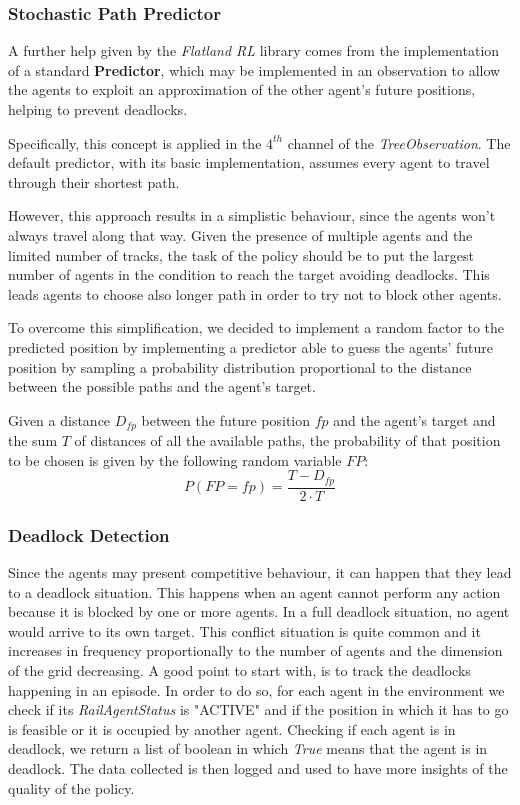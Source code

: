 \documentclass[12pt]{article}
\begin{document}
\subsubsection{Stochastic Path Predictor}

A further help given by the \textit{Flatland RL} library comes from the implementation of a standard \textbf{Predictor}, which may be implemented in an observation to allow the agents to exploit an approximation of the other agent's future positions, helping to prevent deadlocks.

Specifically, this concept is applied in the $4^{th}$ channel of the \textit{TreeObservation}. The default predictor, with its basic implementation, assumes every agent to travel through their shortest path.
 
However, this approach results in a simplistic behaviour, since the agents won't always travel along that way. Given the presence of multiple agents and the limited number of tracks, the task of the policy should be to put the largest number of agents in the condition to reach the target avoiding deadlocks. This leads agents to choose also longer path in order to try not to block other agents.
 
To overcome this simplification, we decided to implement a random factor to the predicted position by implementing a predictor able to guess the agents' future position by sampling a probability distribution proportional to the distance between the possible paths and the agent's target.

Given a distance $D_{fp}$ between the future position $fp$ and the agent's target and the sum $T$ of distances of all the available paths, the probability of that position to be chosen is given by the following random variable $FP$:
\begin{equation}
P(FP=fp) = \frac{T - D_{fp}}{2 \cdot T}    
\end{equation}

\subsubsection{Deadlock Detection}

Since the agents may present competitive behaviour, it can happen that they lead to a deadlock situation. This happens when an agent cannot perform any action because it is blocked by one or more agents. In a full deadlock situation, no agent would arrive to its own target. This conflict situation is quite common and it increases in frequency proportionally to the number of agents and the dimension of the grid decreasing.
A good point to start with, is to track the deadlocks happening in an episode. In order to do so, for each agent in the environment we check if its \textit{RailAgentStatus} is "ACTIVE" and if the position in which it has to go is feasible or it is occupied by another agent. Checking if each agent is in deadlock, we return a list of boolean in which \textit{True} means that the agent is in deadlock. The data collected is then logged and used to have more insights of the quality of the policy.
\end{document}

